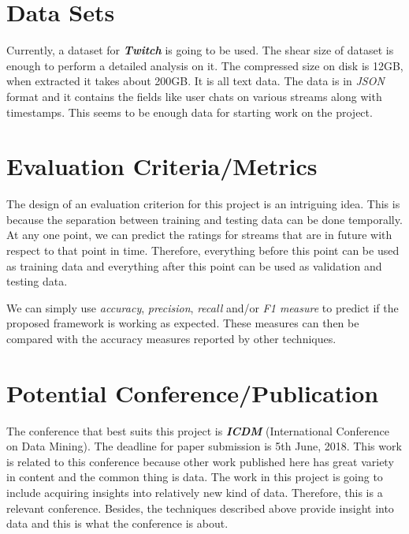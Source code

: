 \documentclass[11pt]{article}
\begin{document}
\section{Data Sets}
\par
Currently, a dataset for \textbf{\textit{Twitch}} is going to be used. The shear size of dataset is enough to perform a detailed analysis on it. The compressed size on disk is 12GB, when extracted it takes about 200GB. It is all text data. The data is in \textit{JSON} format and it contains the fields like user chats on various streams along with timestamps. This seems to be enough data for starting work on the project.


\section{Evaluation Criteria/Metrics}
\par
The design of an evaluation criterion for this project is an intriguing idea. This is because the separation between training and testing data can be done temporally. At any one point, we can predict the ratings for streams that are in future with respect to that point in time. Therefore, everything before this point can be used as training data and everything after this point can be used as validation and testing data.
\par
We can simply use \textit{accuracy}, \textit{precision}, \textit{recall} and/or \textit{F1 measure} to predict if the proposed framework is working as expected. These measures can then be compared with the accuracy measures reported by other techniques.

\section{Potential Conference/Publication}
\par
The conference that best suits this project is \textbf{\textit{ICDM}} (International Conference on Data Mining). The deadline for paper submission is 5th June, 2018. This work is related to this conference because other work published here has great variety in content and the common thing is data. The work in this project is going to include acquiring insights into relatively new kind of data. Therefore, this is a relevant conference. Besides, the techniques described above provide insight into data and this is what the conference is about.
\end{document}
